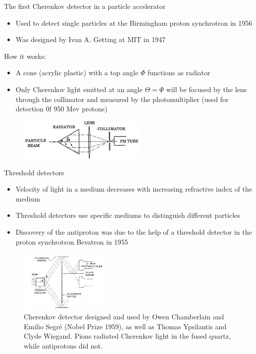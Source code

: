 \documentclass[aspectratio=1610, 10pt]{beamer}
\begin{document}
\begin{frame}{The first Cherenkov detector in a particle accelerator}
  \begin{itemize}
    \item Used to detect single particles at the Birmingham proton synchrotron in 1956
    \medskip
    \item Was designed by Ivan A. Getting at MIT in 1947
  \end{itemize}

How it works:
\begin{itemize}
  \item A cone (acrylic plastic) with a top angle $\Phi$ functions as radiator
  \medskip
  \item Only Cherenkov light emitted at an angle $\Theta = \Phi$ will be focused by the lens through the collimator and measured by the
  photomultiplier (used for detection 0f 950 Mev protons)
\end{itemize}
\begin{figure}
  \includegraphics[width=0.55\textwidth]{images/the_second.png}
\end{figure}
\end{frame}

\begin{frame}{Threshold detectors}
  \begin{itemize}
    \item Velocity of light in a medium decreases with increasing refractive index of the medium
    \medskip
    \item Threshold detectors use specific mediums to distinguish different particles
    \medskip
    \item Discovery of the antiproton was due to the help of a threshold detector in the proton synchrotron Bevatron in 1955
  \end{itemize}
  \begin{figure}
    \includegraphics[width=0.39\textwidth]{images/proton.png}
    \caption{Cherenkov detector designed and used by Owen
     Chamberlain and Emilio Segré (Nobel Prize 1959), as well as Thomas Ypsilantis and Clyde Wiegand.
     Pions radiated Cherenkov light in the fused quartz, while antiprotons did not.}
  \end{figure}
\end{frame}
\end{document}
